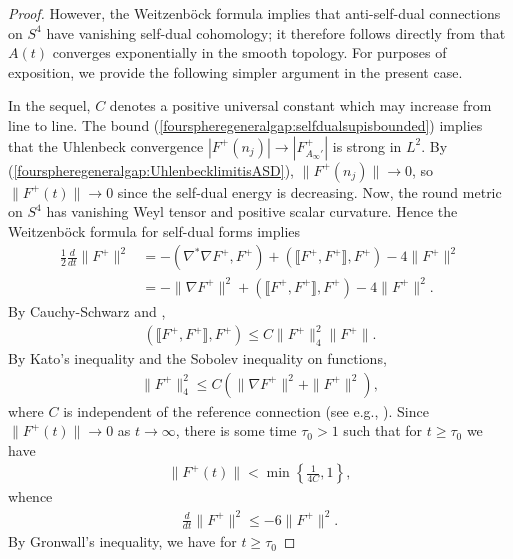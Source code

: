 \documentclass[12pt]{amsart}
\renewcommand{\1}{{\mathbf 1}}
\theoremstyle{others}
\numberwithin{equation}{section}
\begin{document}
\begin{proof}
However, the Weitzenb{\"o}ck formula implies that anti-self-dual connections on $S^4$ have vanishing self-dual cohomology; it therefore follows directly from \cite[Corollary 3.8]{instantons} that $A(t)$ converges exponentially in the smooth topology. For purposes of exposition, we provide the following simpler argument in the present case.


     In the sequel, \(C\) denotes a positive universal constant which may increase from line to line.
     The bound (\ref{fourspheregeneralgap:selfdualsupisbounded}) implies that the Uhlenbeck convergence \(\left| F^+(n_j) \right| \to \left| F_{A_\infty'}^+ \right| \) is strong in \(L^2\). By (\ref{fourspheregeneralgap:UhlenbecklimitisASD}), \(\|F^+(n_j)\| \to 0\), so \(\|F^+(t)\| \to 0\) since the self-dual energy is decreasing. Now, the round metric on \(S^4\) has vanishing Weyl tensor and positive scalar curvature. Hence the Weitzenb{\"o}ck formula for self-dual forms implies
        \begin{align*}
         \frac{1}{2}\frac{d}{dt} \|F^+\|^2 &= - (\nabla^\ast \nabla  F^+, F^+) + (\llbracket F^+, F^+\rrbracket, F^+) - 4 \|F^+\|^2 \\
        &=  -\| \nabla  F^+\|^2 + \left(\llbracket F^+, F^+\rrbracket, F^+ \right) - 4\|F^+\|^2.
    \end{align*} By Cauchy-Schwarz and \cite[Lemma 2.30]{bourguignonlawson},
    \begin{align*}
        \left( \llbracket F^+, F^+\rrbracket, F^+ \right) \leq C \|F^+\|_4^2\|F^+\|.
    \end{align*}By Kato's inequality and the Sobolev inequality on functions,
    \begin{align*}
        \|F^+\|_4^2 \leq C(\|\nabla F^+\|^2 + \|F^+\|^2),
    \end{align*} where \(C\) is independent of the reference connection (see e.g., \cite[(1.16)]{instantons}). Since \(\|F^+(t)\| \to 0\) as \(t \to \infty\), there is some  time \(\tau_0 > 1\) such that for \(t \geq \tau_0\) we have
    \begin{align}\label{fourspheregeneralgap:selfdualenergysmall}
        \|F^+(t)\| < \min\left\{\frac{1}{4C},  1\right\},
    \end{align}whence
    \begin{align*}
        \frac{d}{dt} \|F^+\|^2 \leq -6\|F^+\|^2.
    \end{align*} By Gronwall's inequality, we have for \(t \geq \tau_0\)

\end{proof}
\end{document}
